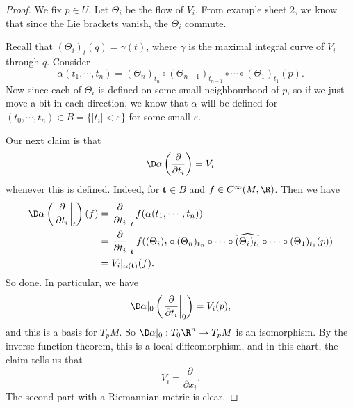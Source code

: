 \documentclass[a4paper]{article}
\begin{document}
\begin{proof}
  We fix $p \in U$. Let $\Theta_i$ be the flow of $V_i$. From example sheet 2, we know that since the Lie brackets vanish, the $\Theta_i$ commute.

  Recall that $(\Theta_i)_t(q) = \gamma(t)$, where $\gamma$ is the maximal integral curve of $V_i$ through $q$. Consider
  \[
    \alpha(t_1, \cdots, t_n) = (\Theta_n)_{t_n} \circ (\Theta_{n - 1})_{t_{n - 1}} \circ \cdots \circ (\Theta_1)_{t_1}(p).
  \]
  Now since each of $\Theta_i$ is defined on some small neighbourhood of $p$, so if we just move a bit in each direction, we know that $\alpha$ will be defined for $(t_0, \cdots, t_n) \in B = \{|t_i| < \varepsilon\}$ for some small $\varepsilon$.

  Our next claim is that
  \[
    \D\alpha\left(\frac{\partial}{\partial t_i}\right) = V_i
  \]
  whenever this is defined. Indeed, for $\mathbf{t} \in B$ and $f \in C^\infty(M, \R)$. Then we have
  \begin{align*}
    \D\alpha \left(\left.\frac{\partial}{\partial t_i}\right|_t\right)(f) &= \left.\frac{\partial}{\partial t_i}\right|_t f(\alpha(t_1, \cdots, t_n))\\
    &= \left.\frac{\partial}{\partial t_i} \right|_{\mathbf{t}} f((\Theta_i)_t \circ (\Theta_n)_{t_n} \circ \cdots \circ \widehat{(\Theta_i)_{t_i}} \circ \cdots \circ (\Theta_1)_{t_1}(p))\\
    &= V_i|_{\alpha(\mathbf{t})}(f).
  \end{align*}
  So done. In particular, we have
  \[
    \D \alpha|_0 \left(\left.\frac{\partial}{\partial t_i}\right|_0\right) = V_i(p),
  \]
  and this is a basis for $T_p M$. So $\D \alpha|_0: T_0 \R^n \to T_p M$ is an isomorphism. By the inverse function theorem, this is a local diffeomorphism, and in this chart, the claim tells us that
  \[
    V_i = \frac{\partial}{\partial x_i}.
  \]
  The second part with a Riemannian metric is clear.
\end{proof}
\end{document}
